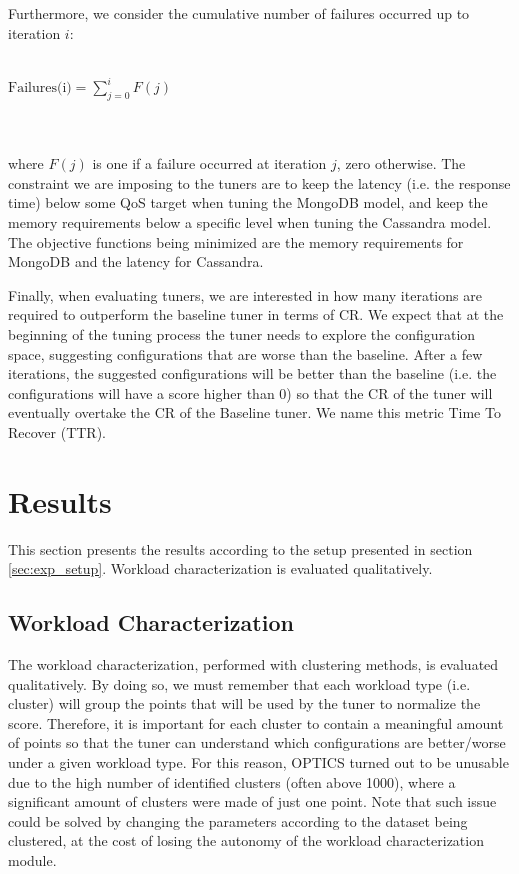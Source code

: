 \documentclass[a4paper, 12pt]{article} %
\begin{document}
	Furthermore, we consider the cumulative number of failures occurred up to iteration $i$:\\\\
	\centerline{
		$
		\text{Failures(i)} = \sum_{j=0}^{i} F(j)
		$
	}\\\\
	where $F(j)$ is one if a failure occurred at iteration $j$, zero otherwise. The constraint we are imposing to the tuners are to keep the latency (i.e. the response time) below some QoS target when tuning the MongoDB model, and keep the memory requirements below a specific level when tuning the Cassandra model.\\
	The objective functions being minimized are the memory requirements for MongoDB and the latency for Cassandra.
	
	Finally, when evaluating tuners, we are interested in how many iterations are required to outperform the baseline tuner in terms of CR. We expect that at the beginning of the tuning process the tuner needs to explore the configuration space, suggesting configurations that are worse than the baseline. After a few iterations, the suggested configurations will be better than the baseline (i.e. the configurations will have a score higher than 0) so that the CR of the tuner will eventually overtake the CR of the Baseline tuner. We name this metric Time To Recover (TTR).
	
	\section{ Results } \label{sec:results}
	This section presents the results according to the setup presented in section \ref{sec:exp_setup}. Workload characterization is evaluated qualitatively. 
	
	\subsection{ Workload Characterization } \label{ssec:results_wkld_characterization}
	The workload characterization, performed with clustering methods, is evaluated qualitatively.
	By doing so, we must remember that each workload type (i.e. cluster) will group the points that will be used by the tuner to normalize the score. Therefore, it is important for each cluster to contain a meaningful amount of points so that the tuner can understand which configurations are better/worse under a given workload type. For this reason, OPTICS turned out to be unusable due to the high number of identified clusters (often above 1000), where a significant amount of clusters were made of just one point. Note that such issue could be solved by changing the parameters according to the dataset being clustered, at the cost of losing the autonomy of the workload characterization module.  
	
\end{document}
